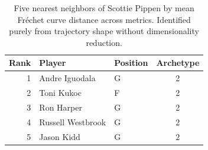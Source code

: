 \begin{table}[htbp]
  \centering\small
  \begin{tabular}{rllc}
    \toprule
    Rank & Player & Position & Archetype \\
    \midrule
    1 & Andre Iguodala & G & 2 \\
    2 & Toni Kukoc & F & 2 \\
    3 & Ron Harper & G & 2 \\
    4 & Russell Westbrook & G & 2 \\
    5 & Jason Kidd & G & 2 \\
    \bottomrule
  \end{tabular}
  \caption{Five nearest neighbors of Scottie Pippen by mean Fr\'{e}chet curve distance across metrics. Identified purely from trajectory shape without dimensionality reduction.}
  \label{tab:Scottie_Pippen_frechet_curve_neighbors}
\end{table}

